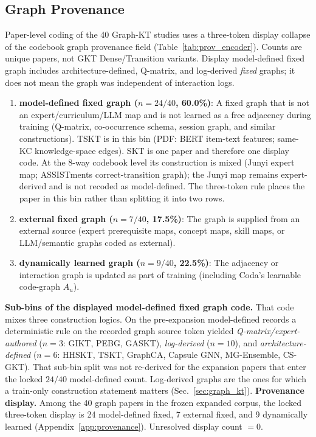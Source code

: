 \documentclass[lettersize,journal]{IEEEtran}
\begin{document}
\subsection{Graph Provenance}
\label{sec:graph_provenance}
Paper-level coding of the 40 Graph-KT studies uses a three-token display collapse of the codebook graph provenance field (Table~\ref{tab:prov_encoder}). Counts are unique papers, not GKT Dense/Transition variants. Display model-defined fixed graph includes architecture-defined, Q-matrix, and log-derived \emph{fixed} graphs; it does not mean the graph was independent of interaction logs.
\begin{enumerate}
    \item \textbf{model-defined fixed graph ($n=24/40$, 60.0\%)}: A fixed graph that is not an expert/curriculum/LLM map and is not learned as a free adjacency during training (Q-matrix, co-occurrence schema, session graph, and similar constructions). TSKT is in this bin (PDF: BERT item-text features; same-KC knowledge-space edges). SKT is one paper and therefore one display code. At the 8-way codebook level its construction is mixed (Junyi expert map; ASSISTments correct-transition graph); the Junyi map remains expert-derived and is not recoded as model-defined. The three-token rule places the paper in this bin rather than splitting it into two rows.
    \item \textbf{external fixed graph ($n=7/40$, 17.5\%)}: The graph is supplied from an external source (expert prerequisite maps, concept maps, skill maps, or LLM/semantic graphs coded as external).
    \item \textbf{dynamically learned graph ($n=9/40$, 22.5\%)}: The adjacency or interaction graph is updated as part of training (including Coda's learnable code-graph \(A_u\)).
\end{enumerate}
\textbf{Sub-bins of the displayed model-defined fixed graph code.} That code mixes three construction logics. On the pre-expansion model-defined records a deterministic rule on the recorded graph source token yielded \emph{Q-matrix/expert-authored} ($n=3$: GIKT, PEBG, GASKT), \emph{log-derived} ($n=10$), and \emph{architecture-defined} ($n=6$: HHSKT, TSKT, GraphCA, Capsule GNN, MG-Ensemble, CS-GKT). That sub-bin split was not re-derived for the expansion papers that enter the locked $24/40$ model-defined count. Log-derived graphs are the ones for which a train-only construction statement matters (Sec.~\ref{sec:graph_kt}).
\textbf{Provenance display.} Among the 40 graph papers in the frozen expanded corpus, the locked three-token display is 24 model-defined fixed, 7 external fixed, and 9 dynamically learned (Appendix~\ref{app:provenance}). Unresolved display count $=0$.
\end{document}
